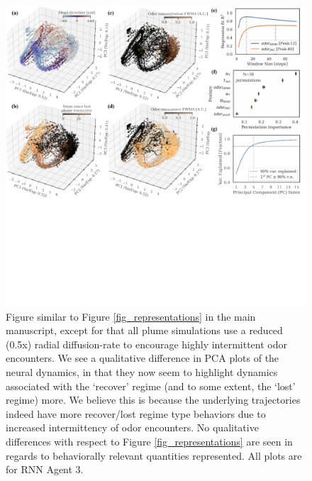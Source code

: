 \documentclass[5p,twocolumn,authoryear]{elsarticle}
\begin{document}
\begin{figure}[h!]
\centering
\includegraphics[width=0.99\linewidth]{fig_repr_d50.pdf}
\caption{
Figure similar to Figure \ref{fig_representations} in the main manuscript, except for that all plume simulations use a reduced (0.5x) radial diffusion-rate to encourage highly intermittent odor encounters. 
We see a qualitative difference in PCA plots of the neural dynamics, in that they now seem to highlight dynamics associated with the `recover' regime (and to some extent, the `lost' regime)  more. 
We believe this is because the underlying trajectories indeed have more recover/lost regime type behaviors due to increased intermittency of odor encounters.
No qualitative differences with respect to Figure \ref{fig_representations} are seen in regards to behaviorally relevant quantities represented.
All plots are for RNN Agent 3.
}
\label{fig_supp_repr_d50}
\end{figure}
\end{document}
